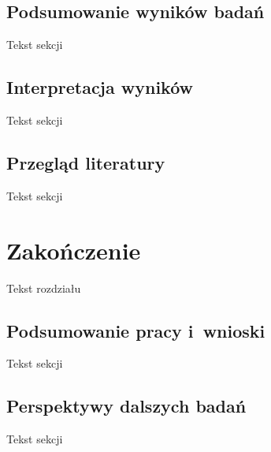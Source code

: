 \documentclass[licencjacka]{pracamgr_Kogni}
\begin{document}
\section{Podsumowanie wyników badań}
Tekst sekcji
\section{Interpretacja wyników}
Tekst sekcji
\section{Przegląd literatury}
Tekst sekcji

\chapter{Zakończenie}
Tekst rozdziału
\section{Podsumowanie pracy i~wnioski}
Tekst sekcji
\section{Perspektywy dalszych badań}
Tekst sekcji
\end{document}
